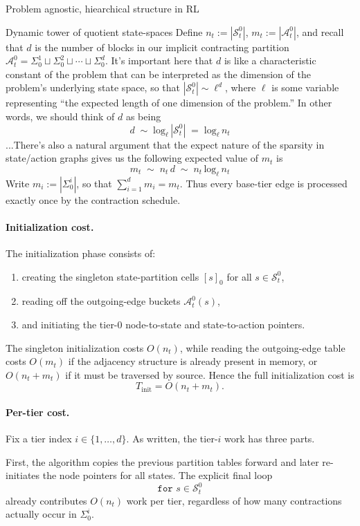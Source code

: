 \documentclass[11pt]{article}
\begin{document}
\begin{section}{Problem agnostic, hiearchical structure in RL}
\begin{subsection}{Dynamic tower of quotient state-spaces}
Define
$
n_t:=|\mathcal{S}_t^0|$,
$
m_t:=|\mathcal{A}_t^0|$, and recall that $d$ is the number of blocks in our implicit contracting partition
$\mathcal{A}_t^0
=
\Sigma_0^1 \sqcup \Sigma_0^2 \sqcup \cdots \sqcup \Sigma_0^d
$.
It's important here that $d$ is like a characteristic constant of the problem that can be interpreted as the dimension of the problem's underlying state space, so that $|\mathcal{S}_t^0|\sim \ell^{d}$, where $\ell$ is some variable representing ``the expected length of one dimension of the problem.'' In other words, we should think of $d$ as being
\begin{equation}\label{eq: approx log}
d\;\sim\;\text{log}_{\ell}\,|\mathcal{S}_t^0|\;=\;\text{log}_{\ell}\,n_{t}
\end{equation}
...There's also a natural argument that the expect nature of the sparsity in state/action graphs gives us the following expected value of $m_{t}$ is
$$
m_{t}
\;\sim\;
n_{t}\,d
\;\sim\;
n_{t}\,\text{log}_{\ell}\,n_{t}
$$
Write
$
m_i:=|\Sigma_0^i|$, so that $\sum_{i=1}^d m_i=m_t.
$
Thus every base-tier edge is processed exactly once by the contraction schedule.

\paragraph{Initialization cost.}
The initialization phase consists of:
\begin{enumerate}
    \item creating the singleton state-partition cells $[s]_0$ for all $s\in\mathcal{S}_t^0$,
    \item reading off the outgoing-edge buckets $\mathcal{A}_t^0(s)$,
    \item and initiating the tier-$0$ node-to-state and state-to-action pointers.
\end{enumerate}
The singleton initialization costs $O(n_t)$, while reading the outgoing-edge table costs $O(m_t)$ if the adjacency structure is already present in memory, or $O(n_t+m_t)$ if it must be traversed by source. Hence the full initialization cost is
\[
T_{\mathrm{init}}=O(n_t+m_t).
\]

\paragraph{Per-tier cost.}
Fix a tier index $i\in\{1,\dots,d\}$. As written, the tier-$i$ work has three parts.

First, the algorithm copies the previous partition tables forward and later re-initiates the node pointers for all states. The explicit final loop
\[
\texttt{for }s\in\mathcal{S}_t^0
\]
already contributes $O(n_t)$ work per tier, regardless of how many contractions actually occur in $\Sigma_0^i$.


\end{subsection}
\end{section}
\end{document}
